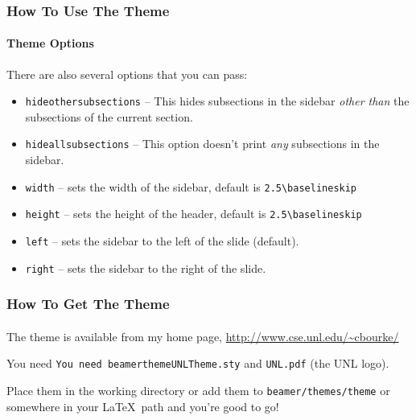 \documentclass{beamer}
\begin{document}
\begin{frame}[fragile]
    \frametitle{How To Use The Theme}
    \framesubtitle{Theme Options}
        
    There are also several options that you can pass:
    \begin{itemize}
      \item \texttt{hideothersubsections} -- This hides subsections in the 
            sidebar \emph{other than} the subsections of the current section.
      \item \texttt{hideallsubsections} -- This option doesn't print \emph{any}
            subsections in the sidebar.
      \item \texttt{width} -- sets the width of the sidebar, default is 
      	    \verb"2.5\baselineskip"
      \item \texttt{height} -- sets the height of the header, default is 
      	    \verb"2.5\baselineskip"
      \item \texttt{left} -- sets the sidebar to the left of the slide (default).
      \item \texttt{right} -- sets the sidebar to the right of the slide.
    \end{itemize}
    
\end{frame}

\begin{frame}
    \frametitle{How To Get The Theme}
    \framesubtitle{}
    
    The theme is available from my home page,
    \textcolor{blue}{\url{http://www.cse.unl.edu/~cbourke/}}
    

    You need \texttt{You need beamerthemeUNLTheme.sty} and \texttt{UNL.pdf}
    (the UNL logo).
    
    Place them in the working directory or add them to \texttt{beamer/themes/theme}
    or somewhere in your \LaTeX\ path and you're good to go!
    
\end{frame}
    
\end{document}
